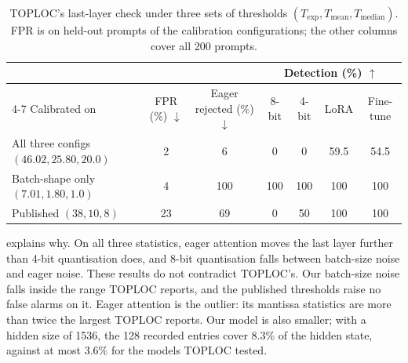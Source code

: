 \documentclass[11pt]{article}
\newcommand{\best}[1]{\cellcolor{blue!8}#1}
\newcommand{\up}{$\uparrow$}
\newcommand{\down}{$\downarrow$}
\begin{document}
\begin{table}[!htb]
\centering
\small
\caption{TOPLOC's last-layer check under three sets of thresholds $(T_{\exp}, T_{\text{mean}}, T_{\text{median}})$. FPR is on held-out prompts of the calibration configurations; the other columns cover all 200 prompts.}
\label{tab:recal}
\begin{tabular}{@{}lcccccc@{}}
\toprule
 & & & \multicolumn{4}{c}{Detection (\%) \up} \\
\cmidrule(l){4-7}
Calibrated on & FPR (\%) \down & Eager rejected (\%) \down & 8-bit & 4-bit & LoRA & Fine-tune \\
\midrule
All three configs $(46.02, 25.80, 20.0)$ & \best{2}  & \best{6}  & 0   & 0   & 59.5 & 54.5 \\
Batch-shape only $(7.01, 1.80, 1.0)$    & 4         & 100       & \best{100} & \best{100} & \best{100} & \best{100} \\
Published $(38, 10, 8)$                 & 23        & 69        & 0   & 50  & \best{100} & \best{100} \\
\bottomrule
\end{tabular}
\end{table}

 explains why.
On all three statistics, eager attention moves the last layer further than 4-bit quantisation does, and 8-bit quantisation falls between batch-size noise and eager noise.
These results do not contradict TOPLOC's.
Our batch-size noise falls inside the range TOPLOC reports, and the published thresholds raise no false alarms on it.
Eager attention is the outlier: its mantissa statistics are more than twice the largest TOPLOC reports.
Our model is also smaller; with a hidden size of 1536, the 128 recorded entries cover 8.3\% of the hidden state, against at most 3.6\% for the models TOPLOC tested.
\end{document}
